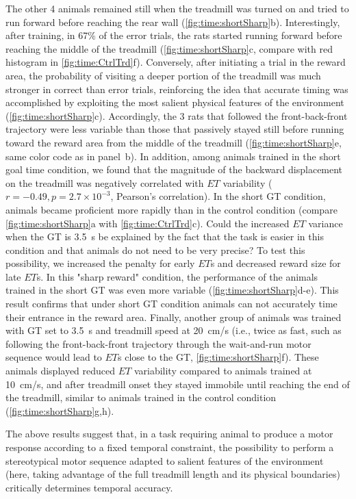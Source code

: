 The other 4 animals remained still when the treadmill was turned on and tried to run forward before reaching the rear wall (\autoref{fig:time:shortSharp}b).
Interestingly, after training, in 67\% of the error trials, the rats started running forward before reaching the middle of the treadmill (\autoref{fig:time:shortSharp}c, compare with red histogram in \autoref{fig:time:CtrlTrd}f).
Conversely, after initiating a trial in the reward area, the probability of visiting a deeper portion of the treadmill was much stronger in correct than error trials, reinforcing the idea that accurate timing was accomplished by exploiting the most salient physical features of the environment (\autoref{fig:time:shortSharp}c).
Accordingly, the 3 rats that followed the front-back-front trajectory were less variable than those that passively stayed still before running toward the reward area from the middle of the treadmill (\autoref{fig:time:shortSharp}e, same color code as in panel~b).
In addition, among animals trained in the short goal time condition, we found that the magnitude of the backward displacement on the treadmill was negatively correlated with $ET$ variability ($r=-0.49, p=2.7\times 10^{-3}$, Pearson's correlation).
In the short GT condition, animals became proficient more rapidly than in the control condition (compare \autoref{fig:time:shortSharp}a with \autoref{fig:time:CtrlTrd}c).
Could the increased $ET$ variance when the GT is 3.5~s be explained by the fact that the task is easier in this condition and that animals do not need to be very precise?
To test this possibility, we increased the penalty for early $ET$s and decreased reward size for late $ET$s.
In this "sharp reward" condition, the performance of the animals trained in the short GT was even more variable (\autoref{fig:time:shortSharp}d-e).
This result confirms that under short GT condition animals can not accurately time their entrance in the reward area.
Finally, another group of animals was trained with GT set to 3.5~s and treadmill speed at 20~cm/s (i.e., twice as fast, such as following the front-back-front trajectory through the wait-and-run motor sequence would lead to $ET$s close to the GT, \autoref{fig:time:shortSharp}f).
These animals displayed reduced $ET$ variability compared to animals trained at 10~cm/s, and after treadmill onset they stayed immobile until reaching the end of the treadmill, similar to animals trained in the control condition (\autoref{fig:time:shortSharp}g,h).
\par

The above results suggest that, in a task requiring animal to produce a motor response according to a fixed temporal constraint, the possibility to perform a stereotypical motor sequence adapted to salient features of the environment (here, taking advantage of the full treadmill length and its physical boundaries) critically determines temporal accuracy.
